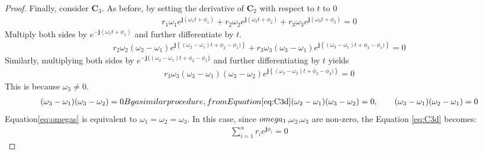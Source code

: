 \documentclass[graybox, envcountchap]{svmult}
\begin{document}
\begin{proof}
Finally, consider $\bm{C}_3$.
As before, by setting the derivative of $\bm{C}_2$ with respect to $t$ to 0
\begin{align}\label{eq:C3d}
r_1 \omega_1 e^{ \bm{j} (\omega_1 t + \phi_1)}
+ r_2 \omega_2 e^{ \bm{j} (\omega_2 t + \phi_2)}
+ r_3 \omega_3 e^{ \bm{j} (\omega_3 t + \phi_3)}=0
\end{align}
Multiply both sides by $e^{ -\bm{j} (\omega_1 t + \phi_1)}$ and further differentiate by $t$.
\begin{align*}
r_2 \omega_2 (\omega_2-\omega_1)
e^{ \bm{j} \left\{ 
(\omega_2-\omega_1) t + \phi_2 - \phi_1)
\right\}
} +
r_3 \omega_3 (\omega_3-\omega_1)
e^{ \bm{j} \left\{ 
(\omega_3-\omega_1) t + \phi_3 - \phi_1)
\right\}
}=0
\end{align*}
Similarly, multiplying both sides by $e^{ -\bm{j} \{(\omega_2-\omega_1) t + \phi_2 - \phi_1\}}$ and further differentiating by $t$ yields
\begin{align*}
r_3 \omega_3 (\omega_3-\omega_1) (\omega_3-\omega_2)
e^{ \bm{j} \left\{ 
(\omega_3-\omega_2) t + \phi_3 - \phi_2)
\right\}
}=0
\end{align*}
This is because $\omega_3\neq0$.
\begin{subequations}\label{eq:omegas}
\begin{align}
(\omega_3-\omega_1) (\omega_3-\omega_2)=0
\end{align}
By a similar procedure, from Equation \ref{eq:C3d}
\begin{align}
(\omega_2-\omega_1) (\omega_3-\omega_2)=0
,\qquad
(\omega_3-\omega_1) (\omega_2-\omega_1)=0
\end{align}
\end{subequations}
Equation\ref{eq:omegas} is equivalent to $\omega_1=\omega_2=\omega_3$.
In this case, since $\\omega_1$,$\omega_2$,$\omega_3$ are non-zero, the Equation \ref{eq:C3d} becomes:
\begin{align*}
\sum_{i=1}^n r_i e^{\bm{j}\phi_i}
=0
\end{align*}
\end{proof}
\end{document}
